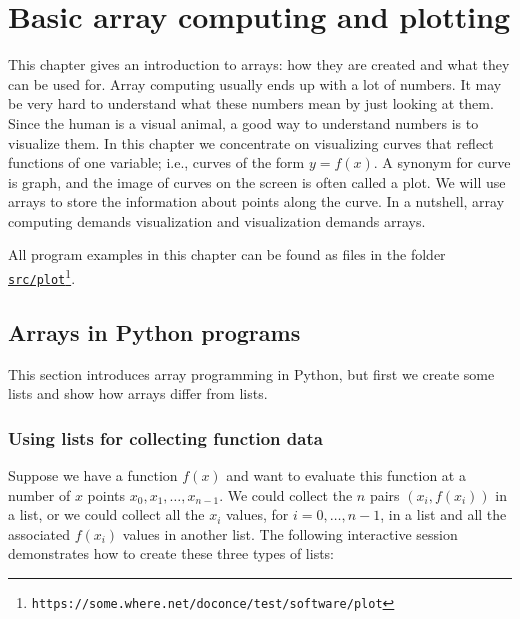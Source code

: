 \documentclass[graybox,sectrefs,envcountresetchap,open=right,final]{svmonodo}
\begin{document}
\mainmatter

\chapter{Basic array computing and plotting}

This chapter gives an introduction to arrays: how they are created
and what they can be used for.  Array computing usually ends up with a
lot of numbers. It may be very hard to understand what these numbers
mean by just looking at them. Since the human is a visual animal, a
good way to understand numbers is to visualize them. In this
chapter we concentrate on visualizing curves that reflect functions
of one variable; i.e., curves of the form $y=f(x)$.  A synonym for
curve is graph, and the image of curves on the screen is often called
a plot.  We will use arrays to store the information about points
along the curve. In a nutshell, array computing demands visualization
and visualization demands arrays.

All program examples in this chapter can be found as files in the
folder \href{{https://some.where.net/doconce/test/software/plot}}{\nolinkurl{src/plot}\footnote{\texttt{https://some.where.net/doconce/test/software/plot}}}.

\section{Arrays in Python programs}
\label{sec:plot:arraycomp}

This section introduces array programming in Python, but first we
create some lists and show how arrays differ from lists.

\subsection{Using lists for collecting function data}
\label{sec:plot:listdata}

Suppose we have a function $f(x)$ and want to evaluate this function
at a number of $x$ points $x_0,x_1,\ldots,x_{n-1}$.  We could collect
the $n$ pairs $(x_i,f(x_i))$ in a list, or we could collect all the
$x_i$ values, for $i=0,\ldots,n-1$, in a list and all the associated
$f(x_i)$ values in another list.  The following interactive session
demonstrates how to create these three types of lists:
\end{document}
